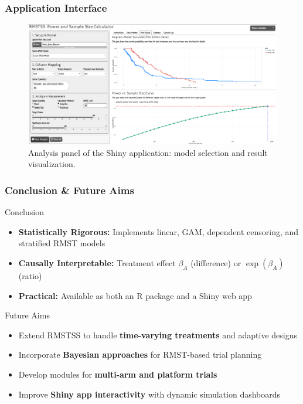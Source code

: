 \documentclass{beamer}
\begin{document}
\begin{frame}
\frametitle{Application Interface}
\begin{figure}
\includegraphics[width=\textwidth]{images/app-ss.png}
\caption{Analysis panel of the Shiny application: model selection and result visualization.}
\end{figure}
\end{frame}

\begin{frame}
\frametitle{Conclusion \& Future Aims}

\begin{block}{Conclusion}
\begin{itemize}
  \item \textbf{Statistically Rigorous:} Implements linear, GAM, dependent censoring, and stratified RMST models
  \item \textbf{Causally Interpretable:} Treatment effect $\beta_A$ (difference) or $\exp(\beta_A)$ (ratio)
  \item \textbf{Practical:} Available as both an R package and a Shiny web app
\end{itemize}
\end{block}

\begin{block}{Future Aims}
\begin{itemize}
  \item Extend RMSTSS to handle \textbf{time-varying treatments} and adaptive designs
  \item Incorporate \textbf{Bayesian approaches} for RMST-based trial planning
  \item Develop modules for \textbf{multi-arm and platform trials}
  \item Improve \textbf{Shiny app interactivity} with dynamic simulation dashboards
\end{itemize}
\end{block}
\end{frame}
\end{document}
